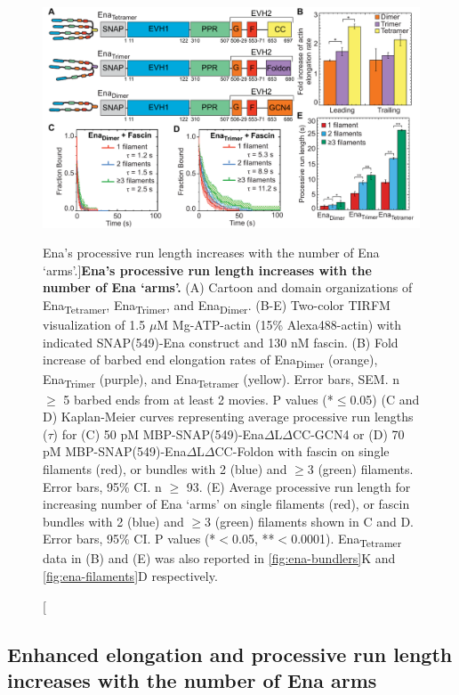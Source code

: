 \begin{figure}
\centering
\includegraphics[width=\textwidth]{img/ch02/Figure_3_elife.pdf}
\caption[Ena's processive run length increases with the number of Ena ‘arms'.]{\textbf{Ena's processive run length increases with the number of Ena ‘arms'.} (A) Cartoon and domain organizations of Ena\textsubscript{Tetramer}, Ena\textsubscript{Trimer}, and Ena\textsubscript{Dimer}. (B-E) Two-color TIRFM visualization of 1.5 $\mu$M Mg-ATP-actin (15\% Alexa488-actin) with indicated SNAP(549)-Ena construct and 130 nM fascin. (B) Fold increase of barbed end elongation rates of Ena\textsubscript{Dimer} (orange), Ena\textsubscript{Trimer} (purple), and Ena\textsubscript{Tetramer} (yellow). Error bars, SEM. n $\geq$ 5 barbed ends from at least 2 movies. P values (*$\leq$0.05) (C and D) Kaplan-Meier curves representing average processive run lengths ($\tau$) for (C) 50 pM MBP-SNAP(549)-Ena$\Delta$L$\Delta$CC-GCN4 or (D) 70 pM MBP-SNAP(549)-Ena$\Delta$L$\Delta$CC-Foldon with fascin on single filaments (red), or bundles with 2 (blue) and $\geq$3 (green) filaments. Error bars, 95\% CI. n $\geq$ 93. (E) Average processive run length for increasing number of Ena ‘arms' on single filaments (red), or fascin bundles with 2 (blue) and $\geq$3 (green) filaments shown in C and D. Error bars, 95\% CI. P values (*$<$0.05, **$<$0.0001). Ena\textsubscript{Tetramer} data in (B) and (E) was also reported in \ref{fig:ena-bundlers}K and \ref{fig:ena-filaments}D respectively. }
\label{fig:ena-arms}
\end{figure}

\subsection{Enhanced elongation and processive run length increases with the number of Ena arms}\label{ena-processive-arms}

